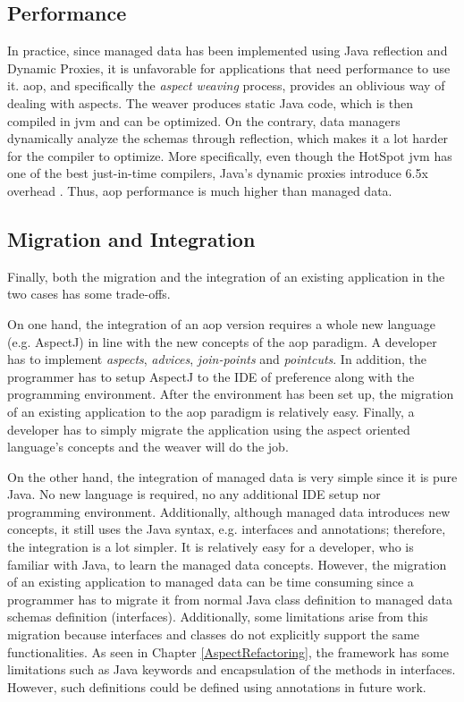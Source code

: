 \subsection{Performance}
In practice, since managed data has been implemented using Java reflection and Dynamic Proxies, it is unfavorable for applications that need performance to use it.
\ac{aop}, and specifically the \textit{aspect weaving} process, provides an oblivious way of dealing with aspects.
The weaver produces static Java code, which is then compiled in \ac{jvm} and can be optimized.
On the contrary, data managers dynamically analyze the schemas through reflection, which makes it a lot harder for the compiler to optimize. 
More specifically, even though the HotSpot \ac{jvm} has one of the best just-in-time compilers, Java's dynamic proxies introduce 6.5x overhead \cite{marr2015zero}.
Thus, \ac{aop} performance is much higher than managed data.

\subsection{Migration and Integration}
Finally, both the migration and the integration of an existing application in the two cases has some trade-offs.

On one hand, the integration of an \ac{aop} version requires a whole new language (e.g. AspectJ) in line with the new concepts of the \ac{aop} paradigm.
A developer has to implement \textit{aspects}, \textit{advices}, \textit{join-points} and \textit{pointcuts}. 
In addition, the programmer has to setup AspectJ to the IDE of preference along with the programming environment.
After the environment has been set up, the migration of an existing application to the \ac{aop} paradigm is relatively easy.
Finally, a developer has to simply migrate the application using the aspect oriented language's concepts and the weaver will do the job.

On the other hand, the integration of managed data is very simple since it is pure Java.
No new language is required, no any additional IDE setup nor programming environment.
Additionally, although managed data introduces new concepts, it still uses the Java syntax, e.g. interfaces and annotations; therefore, the integration is a lot simpler.
It is relatively easy for a developer, who is familiar with Java, to learn the managed data concepts.
However, the migration of an existing application to managed data can be time consuming since a programmer has to migrate it from normal Java class definition  to managed data schemas definition (interfaces).
Additionally, some limitations arise from this migration because interfaces and classes do not explicitly support the same functionalities.
As seen in Chapter \ref{AspectRefactoring}, the framework has some limitations such as Java keywords and encapsulation of the methods in interfaces.
However, such definitions could be defined using annotations in future work.

